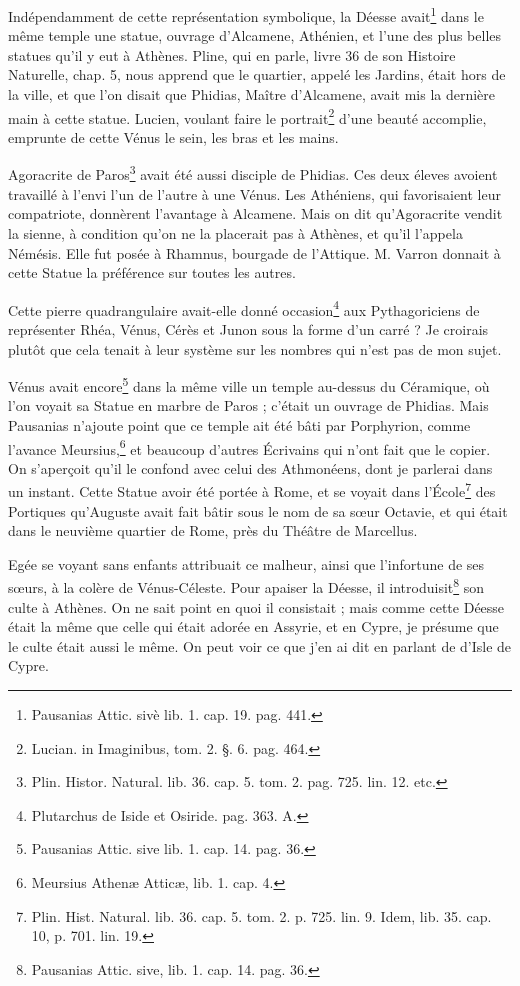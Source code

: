 \documentclass[a4paper, 11pt, oneside, polutonikogreek, french]{article}
\begin{document}
Indépendamment de cette représentation symbolique, la Déesse avait\footnote{Pausanias Attic. sivè lib. 1. cap. 19. pag. 441.} dans le même temple une statue, ouvrage d'Alcamene, Athénien, et l'une des plus belles statues qu'il y eut à Athènes. Pline, qui en parle, livre 36 de son Histoire Naturelle, chap. 5, nous apprend que le quartier, appelé les Jardins, était hors de la ville, et que l'on disait que Phidias, Maître d'Alcamene, avait mis la dernière main à cette statue. Lucien, voulant faire le portrait\footnote{Lucian. in Imaginibus, tom. 2. §. 6. pag. 464.} d'une beauté accomplie, emprunte de cette Vénus le sein, les bras et les mains.

Agoracrite de Paros\footnote{Plin. Histor. Natural. lib. 36. cap. 5. tom. 2. pag. 725. lin. 12. etc.} avait été aussi disciple de Phidias. Ces deux éleves avoient travaillé à l'envi l'un de l'autre à une Vénus. Les Athéniens, qui favorisaient leur compatriote, donnèrent l'avantage à Alcamene. Mais on dit qu'Agoracrite vendit la sienne, à condition qu'on ne la placerait pas à Athènes, et qu'il l'appela Némésis. Elle fut posée à Rhamnus, bourgade de l'Attique. M. Varron donnait à cette Statue la préférence sur toutes les autres.

Cette pierre quadrangulaire avait-elle donné occasion\footnote{Plutarchus de Iside et Osiride. pag. 363. A.} aux Pythagoriciens de représenter Rhéa, Vénus, Cérès et Junon sous la forme d'un carré ? Je croirais plutôt que cela tenait à leur système sur les nombres qui n'est pas de mon sujet.

Vénus avait encore\footnote{Pausanias Attic. sive lib. 1. cap. 14. pag. 36.} dans la même ville un temple au-dessus du Céramique, où l'on voyait sa Statue en marbre de Paros ; c'était un ouvrage de Phidias. Mais Pausanias n'ajoute point que ce temple ait été bâti par Porphyrion, comme l'avance Meursius,\footnote{Meursius Athenæ Atticæ, lib. 1. cap. 4.} et beaucoup d'autres Écrivains qui n'ont fait que le copier. On s'aperçoit qu'il le confond avec celui des Athmonéens, dont je parlerai dans un instant. Cette Statue avoir été portée à Rome, et se voyait dans l'École\footnote{Plin. Hist. Natural. lib. 36. cap. 5. tom. 2. p. 725. lin. 9. Idem, lib. 35. cap. 10, p. 701. lin. 19.} des Portiques qu'Auguste avait fait bâtir sous le nom de sa sœur Octavie, et qui était dans le neuvième quartier de Rome, près du Théâtre de Marcellus.

Egée se voyant sans enfants attribuait ce malheur, ainsi que l'infortune de ses sœurs, à la colère de Vénus-Céleste. Pour apaiser la Déesse, il introduisit\footnote{Pausanias Attic. sive, lib. 1. cap. 14. pag. 36.} son culte à Athènes. On ne sait point en quoi il consistait ; mais comme cette Déesse était la même que celle qui était adorée en Assyrie, et en Cypre, je présume que le culte était aussi le même. On peut voir ce que j'en ai dit en parlant de d'Isle de Cypre.
\end{document}
